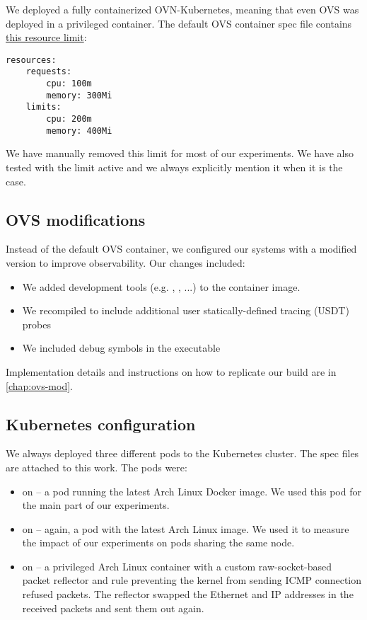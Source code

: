 We deployed a fully containerized OVN-Kubernetes, meaning that even OVS was deployed in a privileged container. The default OVS container spec file contains \href{https://github.com/ovn-org/ovn-kubernetes/blob/master/dist/templates/ovs-node.yaml.j2\#L84-L90}{this resource limit}:

\begin{verbatim}
resources:
    requests:
        cpu: 100m
        memory: 300Mi
    limits:
        cpu: 200m
        memory: 400Mi
\end{verbatim}

We have manually removed this limit for most of our experiments. We have also tested with the limit active and we always explicitly mention it when it is the case.

\subsection{OVS modifications}

Instead of the default OVS container, we configured our systems with a modified version to improve observability. Our changes included:

\begin{itemize}
    \item We added development tools (e.g. , , ...) to the container image.
    \item We recompiled  to include additional user statically-defined tracing (USDT) \cite{USDT} probes
    \item We included debug symbols in the  executable
\end{itemize}

Implementation details and instructions on how to replicate our build are in \cref{chap:ovs-mod}.

\subsection{Kubernetes configuration}

We always deployed three different pods to the Kubernetes cluster. The spec files are attached to this work. The pods were:

\begin{itemize}
    \item {} on  -- a pod running the latest Arch Linux Docker image. We used this pod for the main part of our experiments.

    \item {} on  -- again, a pod with the latest Arch Linux image. We used it to measure the impact of our experiments on pods sharing the same node.

    \item {} on  -- a privileged Arch Linux container with a custom raw-socket-based packet reflector and  rule preventing the kernel from sending ICMP connection refused packets. The reflector swapped the Ethernet and IP addresses in the received packets and sent them out again.
\end{itemize}

